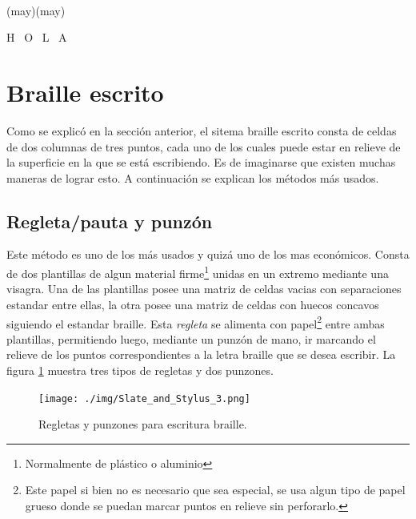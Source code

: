\begin{center}
    
\\
\begin{scriptsize}(may)(may)\end{scriptsize} H \, O \, L \, A\\
\end{center}

\newpage
\section{Braille escrito}
%
Como se explic\'o en la secci\'on anterior, el sitema braille escrito consta
de celdas de dos columnas de tres puntos, cada uno de los cuales puede estar
en relieve de la superficie en la que se est\'a escribiendo. Es de imaginarse
que existen muchas maneras de lograr esto. A continuaci\'on se explican los
m\'etodos m\'as usados.

\subsection{Regleta/pauta y punz\'on} 
%
Este m\'etodo es uno de los m\'as usados y quiz\'a uno de los mas econ\'omicos.
Consta de dos plantillas de algun material firme\footnote{Normalmente de
pl\'astico o aluminio} unidas en un extremo mediante una visagra. Una de las
plantillas posee una matriz de celdas vacias con separaciones estandar entre
ellas, la otra posee una matriz de celdas con huecos concavos siguiendo el
estandar braille. Esta \emph{regleta} se alimenta con papel\footnote{Este
papel si bien no es necesario que sea especial, se usa algun tipo de papel
grueso donde se puedan marcar puntos en relieve sin perforarlo.} entre ambas
plantillas, permitiendo luego, mediante un punz\'on de mano, ir marcando el
relieve de los puntos correspondientes a la letra braille que se desea
escribir. La figura \ref{fig:Slate_and_Stylus_3} muestra tres
tipos de regletas y dos punzones.

\begin{figure}[htp]
\centering
\texttt{[image: ./img/Slate\_and\_Stylus\_3.png]}
\caption{Regletas y punzones para escritura braille.}
\label{fig:Slate_and_Stylus_3}
\end{figure}

